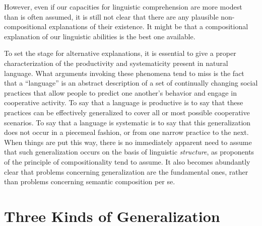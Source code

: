 However, even if our capacities for linguistic comprehension are more modest than is often assumed, it is still not clear that there are any plausible non-compositional explanations of their existence. It might be that a compositional explanation of our linguistic abilities is the best one available. 

To set the stage for alternative explanations, it is essential to give a proper characterization of the productivity and systematicity present in natural language. What arguments invoking these phenomena tend to miss is the fact that a ``language'' is an abstract description of a set of continually changing social practices that allow people to predict one another's behavior and engage in cooperative activity. To say that a language is productive is to say that these practices can be effectively generalized to cover all or most possible cooperative scenarios. To say that a language is systematic is to say that this generalization does not occur in a piecemeal fashion, or from one narrow practice to the next. When things are put this way, there is no immediately apparent need to assume that such generalization occurs on the basis of linguistic \textit{structure}, as proponents of the principle of compositionality tend to assume. It also becomes abundantly clear that problems concerning generalization are the fundamental ones, rather than problems concerning semantic composition per se.

\section{Three Kinds of Generalization}

